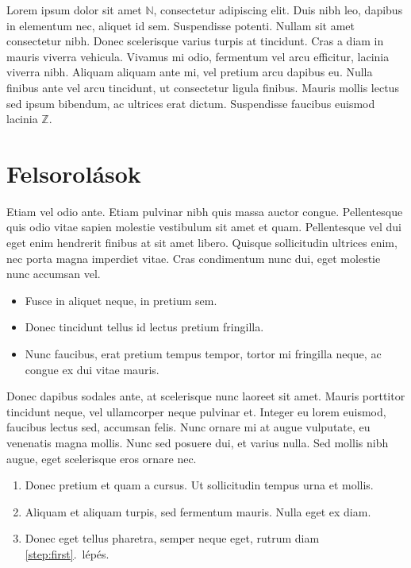 Lorem ipsum dolor sit amet $\mathbb{N}$, consectetur adipiscing elit. Duis nibh leo, dapibus in elementum nec, aliquet id sem. Suspendisse potenti. Nullam sit amet consectetur nibh. Donec scelerisque varius turpis at tincidunt. Cras a diam in mauris viverra vehicula. Vivamus mi odio, fermentum vel arcu efficitur, lacinia viverra nibh. Aliquam aliquam ante mi, vel pretium arcu dapibus eu. Nulla finibus ante vel arcu tincidunt, ut consectetur ligula finibus. Mauris mollis lectus sed ipsum bibendum, ac ultrices erat dictum. Suspendisse faucibus euismod lacinia $\mathbb{Z}$.


\section{Felsorolások}

Etiam vel odio ante. Etiam pulvinar nibh quis massa auctor congue. Pellentesque quis odio vitae sapien molestie vestibulum sit amet et quam. Pellentesque vel dui eget enim hendrerit finibus at sit amet libero. Quisque sollicitudin ultrices enim, nec porta magna imperdiet vitae. Cras condimentum nunc dui, eget molestie nunc accumsan vel.

\begin{itemize}
	\item Fusce in aliquet neque, in pretium sem.
	\item Donec tincidunt tellus id lectus pretium fringilla.
	\item Nunc faucibus, erat pretium tempus tempor, tortor mi fringilla neque, ac congue ex dui vitae mauris.
\end{itemize}

Donec dapibus sodales ante, at scelerisque nunc laoreet sit amet. Mauris porttitor tincidunt neque, vel ullamcorper neque pulvinar et. Integer eu lorem euismod, faucibus lectus sed, accumsan felis. Nunc ornare mi at augue vulputate, eu venenatis magna mollis. Nunc sed posuere dui, et varius nulla. Sed mollis nibh augue, eget scelerisque eros ornare nec.

\begin{enumerate}
	\item\label{step:first} Donec pretium et quam a cursus. Ut sollicitudin tempus urna et mollis.
	\item Aliquam et aliquam turpis, sed fermentum mauris. Nulla eget ex diam.
	\item Donec eget tellus pharetra, semper neque eget, rutrum diam \ref{step:first}.~lépés.
\end{enumerate}

